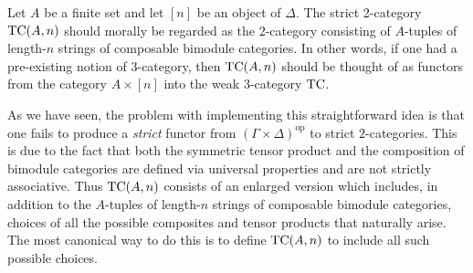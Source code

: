\documentclass[a4paper]{amsart}
\begin{document}
Let $A$ be a finite set and let $[n]$ be an object of $\Delta$. The strict 2-category $\mathrm{TC}(A,n)$ should morally be regarded as the 2-category consisting of $A$-tuples of length-$n$ strings of composable bimodule categories. In other words, if one had a pre-existing notion of 3-category, then $\mathrm{TC}(A,n)$ should be thought of as  functors from the category $A \times [n]$ into the weak 3-category $\mathrm{TC}$.

As we have seen, the problem with implementing this straightforward idea is that one fails to produce a {\em strict} functor from $(\Gamma \times \Delta)^\textrm{op}$ to strict $2$-categories. This is due to the fact that both the symmetric tensor product and the composition of bimodule categories are defined via universal properties and are not strictly associative. Thus $\mathrm{TC}(A,n)$ consists of an enlarged version which includes, in addition to the 
$A$-tuples of length-$n$ strings of composable bimodule categories, choices of all the possible composites and tensor products that naturally arise. The most canonical way to do this is to define $\mathrm{TC}(A,n)$ to include all such possible choices. 



\end{document}
